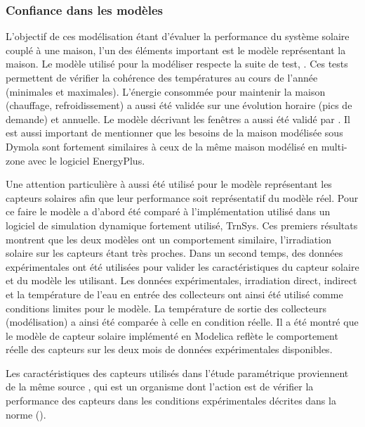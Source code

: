 \subsubsection{Confiance dans les modèles} %
\label{ssub:confiance_dans_les_modeles}
L’objectif de ces modélisation étant d’évaluer la performance du système solaire
couplé à une maison, l’un des éléments important est le modèle représentant la maison.
Le modèle utilisé pour la modéliser respecte la suite de test, .
Ces tests permettent de vérifier la cohérence des températures au cours de l’année
(minimales et maximales). L’énergie consommée pour maintenir la maison (chauffage, refroidissement)
a aussi été validée sur une évolution horaire (pics de demande) et annuelle.
Le modèle décrivant les fenêtres a aussi été validé par .
Il est aussi important de mentionner que les besoins de la maison modélisée sous Dymola
sont fortement similaires à ceux de la même maison modélisé en multi-zone avec le logiciel
EnergyPlus.

Une attention particulière à aussi été utilisé pour le modèle représentant les capteurs
solaires afin que leur performance soit représentatif du modèle réel. Pour ce faire
le modèle a d’abord été comparé à l’implémentation utilisé dans un logiciel de
simulation dynamique fortement utilisé, TrnSys. Ces premiers résultats montrent que
les deux modèles ont un comportement similaire, l’irradiation solaire sur les capteurs
étant très proches.
Dans un second temps, des données expérimentales ont été utilisées pour valider les
caractéristiques du capteur solaire et du modèle les utilisant.
Les données expérimentales, irradiation direct, indirect et la température de l’eau
en entrée des collecteurs ont ainsi été utilisé comme conditions limites pour le
modèle. La température de sortie des collecteurs (modélisation) a ainsi été comparée
à celle en condition réelle. Il a été montré que le modèle de capteur solaire
implémenté en Modelica reflète le comportement réelle des capteurs sur les deux mois
de données expérimentales disponibles.

Les caractéristiques des capteurs utilisés dans l’étude paramétrique proviennent
de la même source , qui est un organisme dont l’action est de
vérifier la performance des capteurs dans les conditions expérimentales décrites
dans la norme ().

